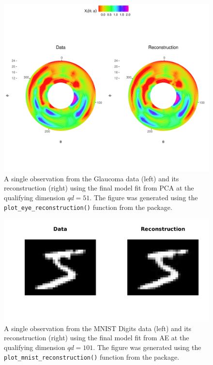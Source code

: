 \begin{figure}
    \centering
    \includegraphics[width=0.75\linewidth]{figures/eye-reconstruction.pdf}
    \caption{A single observation from the Glaucoma data (left) and its reconstruction (right) using the final model fit from PCA at the qualifying dimension $qd = 51$. The figure was generated using the \texttt{plot\_eye\_reconstruction()} function from the  package.}
    \label{fig:eye-reconstruction}
\end{figure}


\begin{figure}
    \centering
    \includegraphics[width=0.75\linewidth]{figures/mnist-reconstruction.pdf}
    \caption{A single observation from the MNIST Digits data (left) and its reconstruction (right) using the final model fit from AE at the qualifying dimension $qd = 101$. The figure was generated using the \texttt{plot\_mnist\_reconstruction()} function from the  package.}
    \label{fig:mnist-reconstruction}
\end{figure}

